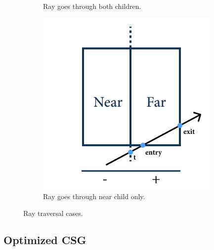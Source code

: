 \documentclass[a4paper,11pt,oneside]{article}
\begin{document}
\begin{figure}[ht]
\begin{subfigure}[b]{0.3\textwidth}
		\caption{Ray goes through both children.}
		\label{sec4.3:both-children}
	\end{subfigure}
	\hfill
	\begin{subfigure}[b]{0.3\textwidth}
		\centering
		\includegraphics[width=\textwidth]{section4/4.3/far-intersection.png}
		\caption{Ray goes through near child only.}
		\label{sec4.3:far-child}
	\end{subfigure}
	\hfill
	\caption{Ray traversal cases.}
	\label{sec4.3:ray-traversal-cases}
\end{figure}

\subsection{Optimized CSG}
\end{document}
